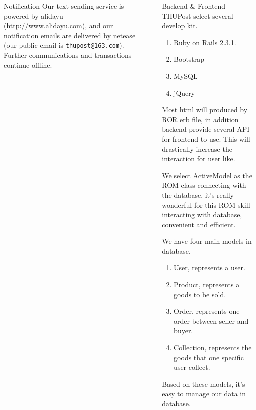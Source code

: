 \documentclass[final]{beamer}
\newlength{\sepwid}
\newlength{\onecolwid}
\begin{document}
\begin{frame}[t]
\begin{columns}[t]
\begin{column}{\onecolwid}
\begin{block}{Notification}
            Our text sending service is powered by alidayu (\url{http://www.alidayu.com}), and our notification
            emails are delivered by netease (our public email is \texttt{thupost@163.com}). Further communications and
            transactions continue offline.
        \end{block}



    \end{column} %
    \begin{column}{\sepwid}\end{column} %
    \begin{column}{\onecolwid}\vspace{-.6in} %
    

        \begin{block}{Backend \& Frontend}
        THUPost select several develop kit.
        \begin{enumerate}
        \item Ruby on Rails 2.3.1.
        \item Bootstrap
        \item MySQL
        \item jQuery
        \end{enumerate}

        Most html will produced by ROR erb file, in addition backend provide several API for frontend to use. This will drastically increase the interaction for user like.

        We select ActiveModel as the ROM class connecting with the database, it's really wonderful for this ROM skill interacting with database, convenient and efficient.

        We have four main models in database.
        \begin{enumerate}
        \item User, represents a user.
        \item Product, represents a goods to be sold.
        \item Order, represents one order between seller and buyer.
        \item Collection, represents the goods that one specific user collect.
        \end{enumerate}
        Based on these models, it's easy to manage our data in database.
        \end{block}


\end{column}
\end{columns}
\end{frame}
\end{document}
